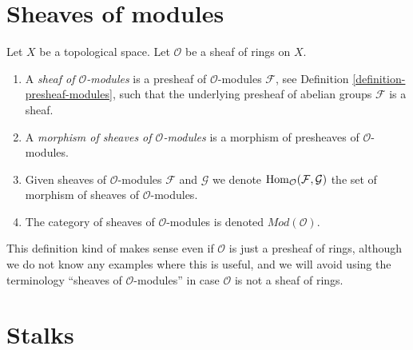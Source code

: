 \section{Sheaves of modules}
\label{section-sheaves-modules}

\begin{definition}
\label{definition-sheaf-modules}
Let $X$ be a topological space.
Let $\mathcal{O}$ be a sheaf of rings on $X$.
\begin{enumerate}
\item A {\it sheaf of $\mathcal{O}$-modules} is a presheaf
of $\mathcal{O}$-modules $\mathcal{F}$,
see Definition \ref{definition-presheaf-modules},
such that the underlying presheaf of abelian groups $\mathcal{F}$
is a sheaf.
\item A {\it morphism of sheaves of $\mathcal{O}$-modules}
is a morphism of presheaves of $\mathcal{O}$-modules.
\item Given sheaves of $\mathcal{O}$-modules
$\mathcal{F}$ and $\mathcal{G}$ we denote
$\mathop{\mathrm{Hom}}\nolimits_\mathcal{O}(\mathcal{F}, \mathcal{G})$
the set of morphism of sheaves of $\mathcal{O}$-modules.
\item The category of sheaves of $\mathcal{O}$-modules
is denoted $\textit{Mod}(\mathcal{O})$.
\end{enumerate}
\end{definition}

\noindent
This definition kind of makes sense even if $\mathcal{O}$ is just a
presheaf of rings, although we do not know any examples where
this is useful, and we will avoid using the terminology
``sheaves of $\mathcal{O}$-modules''
in case $\mathcal{O}$ is not a sheaf of rings.







\section{Stalks}
\label{section-stalks}

